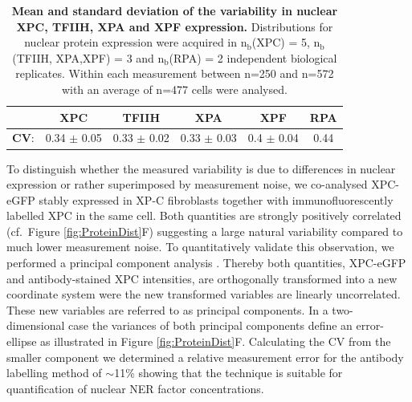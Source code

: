 \begin{table}[h!]
	\centering
	\begin{tabular}{cccccc}
		\hline
		\rule{0pt}{2ex}
		&\textbf{XPC} & \textbf{TFIIH} & \textbf{XPA} & \textbf{XPF} & \textbf{RPA}\\ \hline
		\rule{0pt}{3ex}
		\textbf{CV}: & 0.34 $\pm$ 0.05 & 0.33 $\pm$ 0.02 & 0.33 $\pm$ 0.03 & 0.4 $\pm$ 0.04 & 0.44\\ \hline
		
	\end{tabular}
	\caption{\textbf{Mean and standard deviation of the variability in nuclear XPC, TFIIH, XPA and XPF expression.} Distributions for nuclear protein expression were acquired in $\text{n}_\text{b}$(XPC) = 5, $\text{n}_\text{b}$(TFIIH, XPA,XPF) = 3 and $\text{n}_\text{b}$(RPA) = 2 independent biological replicates. Within each measurement between n=250 and n=572 with an average of n=477 cells were analysed.}\label{tab:proteinVariability}
\end{table}      

To distinguish whether the measured variability is due to differences in nuclear expression or rather superimposed by measurement noise, we co-analysed XPC-eGFP stably expressed in XP-C fibroblasts together with immunofluorescently labelled XPC in the same cell. Both quantities are strongly positively correlated (cf.\ Figure \ref{fig:ProteinDist}F) suggesting a large natural variability compared to much lower measurement noise. To quantitatively validate this observation, we performed a principal component analysis \cite{Pearson1901}. Thereby both quantities, XPC-eGFP and antibody-stained XPC intensities, are orthogonally transformed into a new coordinate system were the new transformed variables are linearly uncorrelated. These new variables are referred to as principal components. In a two-dimensional case the variances of both principal components define an error-ellipse as illustrated in Figure \ref{fig:ProteinDist}F. Calculating the CV from the smaller component we determined a relative measurement error for the antibody labelling method of $\sim$11\% showing that the technique is suitable for quantification of nuclear NER factor concentrations.       

